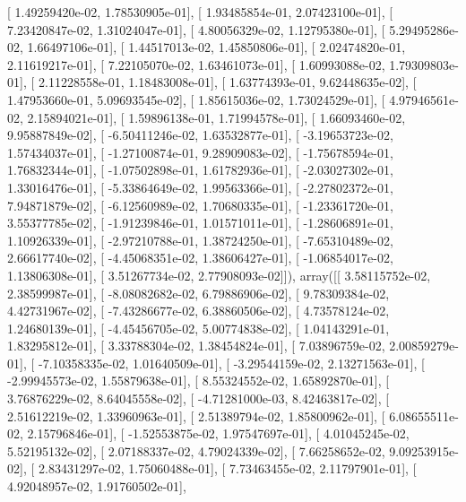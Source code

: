 \documentclass{article}
\begin{document}
       [  1.49259420e-02,   1.78530905e-01],
       [  1.93485854e-01,   2.07423100e-01],
       [  7.23420847e-02,   1.31024047e-01],
       [  4.80056329e-02,   1.12795380e-01],
       [  5.29495286e-02,   1.66497106e-01],
       [  1.44517013e-02,   1.45850806e-01],
       [  2.02474820e-01,   2.11619217e-01],
       [  7.22105070e-02,   1.63461073e-01],
       [  1.60993088e-02,   1.79309803e-01],
       [  2.11228558e-01,   1.18483008e-01],
       [  1.63774393e-01,   9.62448635e-02],
       [  1.47953660e-01,   5.09693545e-02],
       [  1.85615036e-02,   1.73024529e-01],
       [  4.97946561e-02,   2.15894021e-01],
       [  1.59896138e-01,   1.71994578e-01],
       [  1.66093460e-02,   9.95887849e-02],
       [ -6.50411246e-02,   1.63532877e-01],
       [ -3.19653723e-02,   1.57434037e-01],
       [ -1.27100874e-01,   9.28909083e-02],
       [ -1.75678594e-01,   1.76832344e-01],
       [ -1.07502898e-01,   1.61782936e-01],
       [ -2.03027302e-01,   1.33016476e-01],
       [ -5.33864649e-02,   1.99563366e-01],
       [ -2.27802372e-01,   7.94871879e-02],
       [ -6.12560989e-02,   1.70680335e-01],
       [ -1.23361720e-01,   3.55377785e-02],
       [ -1.91239846e-01,   1.01571011e-01],
       [ -1.28606891e-01,   1.10926339e-01],
       [ -2.97210788e-01,   1.38724250e-01],
       [ -7.65310489e-02,   2.66617740e-02],
       [ -4.45068351e-02,   1.38606427e-01],
       [ -1.06854017e-02,   1.13806308e-01],
       [  3.51267734e-02,   2.77908093e-02]]), array([[  3.58115752e-02,   2.38599987e-01],
       [ -8.08082682e-02,   6.79886906e-02],
       [  9.78309384e-02,   4.42731967e-02],
       [ -7.43286677e-02,   6.38860506e-02],
       [  4.73578124e-02,   1.24680139e-01],
       [ -4.45456705e-02,   5.00774838e-02],
       [  1.04143291e-01,   1.83295812e-01],
       [  3.33788304e-02,   1.38454824e-01],
       [  7.03896759e-02,   2.00859279e-01],
       [ -7.10358335e-02,   1.01640509e-01],
       [ -3.29544159e-02,   2.13271563e-01],
       [ -2.99945573e-02,   1.55879638e-01],
       [  8.55324552e-02,   1.65892870e-01],
       [  3.76876229e-02,   8.64045558e-02],
       [ -4.71281000e-03,   8.42463817e-02],
       [  2.51612219e-02,   1.33960963e-01],
       [  2.51389794e-02,   1.85800962e-01],
       [  6.08655511e-02,   2.15796846e-01],
       [ -1.52553875e-02,   1.97547697e-01],
       [  4.01045245e-02,   5.52195132e-02],
       [  2.07188337e-02,   4.79024339e-02],
       [  7.66258652e-02,   9.09253915e-02],
       [  2.83431297e-02,   1.75060488e-01],
       [  7.73463455e-02,   2.11797901e-01],
       [  4.92048957e-02,   1.91760502e-01],
\end{document}
